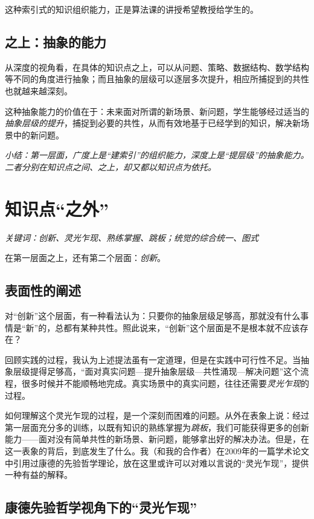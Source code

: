 \nid 这种索引式的知识组织能力，正是算法课的讲授希望教授给学生的。

\subsection{之上：抽象的能力}

从深度的视角看，在具体的知识点之上，可以从问题、策略、数据结构、数学结构等不同的角度进行抽象；而且抽象的层级可以逐层多次提升，相应所捕捉到的共性也就越来越深刻。

这种抽象能力的价值在于：未来面对所谓的新场景、新问题，学生能够经过适当的\textit{抽象层级的提升}，捕捉到必要的共性，从而有效地基于已经学到的知识，解决新场景中的新问题。

\medskip
\nid\textit{小结：第一层面，广度上是“建索引”的组织能力，深度上是“提层级”的抽象能力。二者分别在知识点之间、之上，却又都以知识点为依托。}

\section{知识点“之外”}

\noindent\textit{关键词：创新、灵光乍现、熟练掌握、跳板；统觉的综合统一、图式}

\medskip
在第一层面之上，还有第二个层面：\textit{创新}。

\subsection{表面性的阐述}

对“创新”这个层面，有一种看法认为：只要你的抽象层级足够高，那就没有什么事情是“新”的，总都有某种共性。照此说来，“创新”这个层面是不是根本就不应该存在？

回顾实践的过程，我认为上述提法虽有一定道理，但是在实践中可行性不足。当抽象层级提得足够高，“面对真实问题—提升抽象层级—共性涌现—解决问题”这个流程，很多时候并不能顺畅地完成。真实场景中的真实问题，往往还需要\textit{灵光乍现}的过程。

如何理解这个灵光乍现的过程，是一个深刻而困难的问题。从外在表象上说：经过第一层面充分多的训练，以既有知识的熟练掌握为\textit{跳板}，我们可能获得更多的创新能力——面对没有简单共性的新场景、新问题，能够拿出好的解决办法。但是，在这一表象的背后，到底发生了什么。我（和我的合作者）在2009年的一篇学术论文中引用过康德的先验哲学理论，放在这里或许可以对难以言说的“灵光乍现”，提供一种有益的解释。

\subsection{康德先验哲学视角下的“灵光乍现”}

